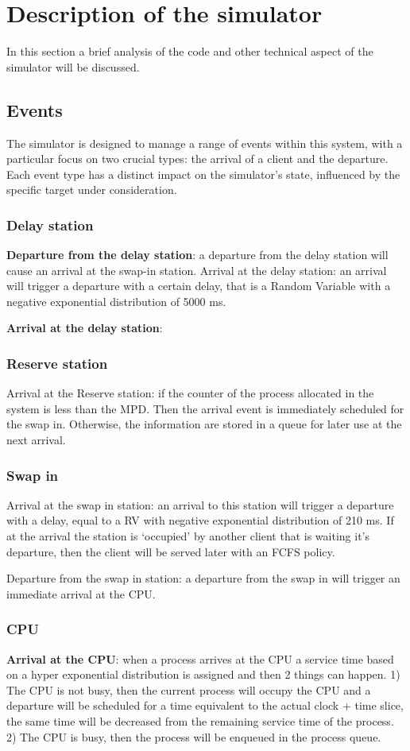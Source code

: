 \documentclass[12pt,a4paper]{article}
\begin{document}
\section{Description of the simulator}
In this section a brief analysis of the code and other technical aspect of the simulator will be discussed.
\subsection{Events}
The simulator is designed to manage a range of events within this system, with a particular focus on two crucial types: the arrival of a client and the departure. Each event type has a distinct impact on the simulator's state, influenced by the specific target under consideration.
\subsubsection{Delay station}

\textbf{Departure from the delay station}: a departure from the delay station will cause an arrival at the swap-in station.
Arrival at the delay station: an arrival will trigger a departure with a certain delay, that is a Random Variable with a negative exponential distribution of 5000 ms.

\textbf{Arrival at the delay station}:

\subsubsection{Reserve station}
Arrival at the Reserve station: if the counter of the process allocated in the system is less than the MPD. Then the  arrival event is immediately scheduled for the swap in. Otherwise, the information are stored in a queue for later use at the next arrival.

\subsubsection{Swap in}
Arrival at the swap in station: an arrival to this station will trigger a departure with a delay, equal to a RV with negative exponential distribution of 210 ms. If at the arrival the station is `occupied' by another client that is waiting it's departure, then the client will be served later with an FCFS policy.

Departure from the swap in station: a departure from the swap in will trigger an immediate arrival at the CPU.

\subsubsection{CPU}
\textbf{Arrival at the CPU}: when a process arrives at the CPU a service time based on a hyper exponential distribution is assigned and then 2 things can happen. 1) The CPU is not busy, then the current process will occupy the CPU and a departure will be scheduled for a time equivalent to the actual clock + time slice, the same time will be decreased from the remaining service time of the process. 2) The CPU is busy, then the process will be enqueued in the process queue.
\end{document}
